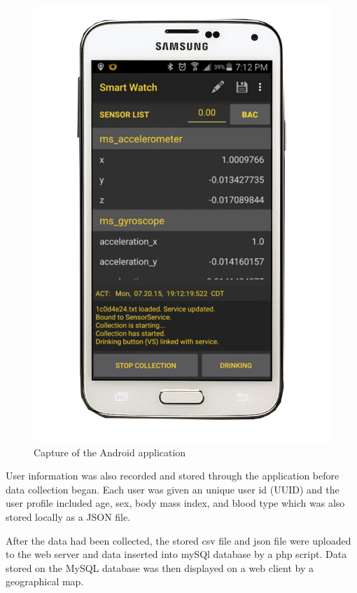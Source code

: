 \begin{figure}[H]
	\centering
	\includegraphics[scale=.20]{../figs/smartwatch.png}
	\caption{Capture of the Android application}
	\label{app}
\end{figure}

User information was also recorded and stored through the application before data collection began. Each user was given an unique user id (UUID) and the user profile included age, sex, body mass index, and blood type which was also stored locally as a JSON file.

After the data had been collected, the stored csv file and json file were uploaded to the web server and data inserted into mySQl database by a php script. Data stored on the MySQL database was then displayed on a web client by a geographical map. 


